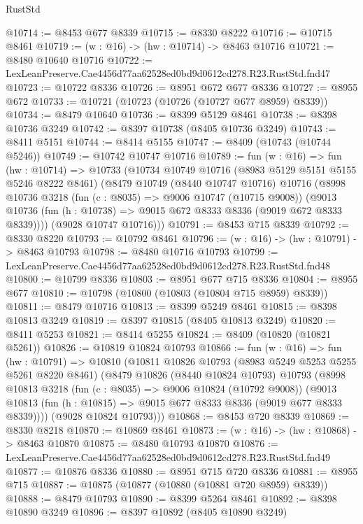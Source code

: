 \begin{lexlean}{RustStd}
\begin{coremodule}
@10714 := @8453 @677 @8339
@10715 := @8330 @8222
@10716 := @10715 @8461
@10719 := (w : @16) -> (hw : @10714) -> @8463 @10716
@10721 := @8480 @10640 @10716
@10722 := LexLeanPreserve.Cae4456d77aa62528ed0bd9d0612cd278.R23.RustStd.fnd47
@10723 := @10722 @8336
@10726 := @8951 @672 @677 @8336
@10727 := @8955 @672
@10733 := @10721 (@10723 (@10726 (@10727 @677 @8959) @8339))
@10734 := @8479 @10640
@10736 := @8399 @5129 @8461
@10738 := @8398 @10736 @3249
@10742 := @8397 @10738 (@8405 @10736 @3249)
@10743 := @8411 @5151
@10744 := @8414 @5155
@10747 := @8409 (@10743 (@10744 @5246))
@10749 := @10742 @10747 @10716
@10789 := fun (w : @16) =>
  fun (hw : @10714) =>
  @10733
    (@10734
      @10749
      @10716
      (@8983 @5129 @5151 @5155 @5246 @8222 @8461)
      (@8479
        @10749
        (@8440 @10747 @10716)
        @10716
        (@8998
          @10736
          @3218
          (fun (c : @8035) => @9006 @10747 (@10715 @9008))
          (@9013 @10736 (fun (h : @10738) => @9015 @672 @8333 @8336 (@9019 @672 @8333 @8339))))
        (@9028 @10747 @10716)))
@10791 := @8453 @715 @8339
@10792 := @8330 @8220
@10793 := @10792 @8461
@10796 := (w : @16) -> (hw : @10791) -> @8463 @10793
@10798 := @8480 @10716 @10793
@10799 := LexLeanPreserve.Cae4456d77aa62528ed0bd9d0612cd278.R23.RustStd.fnd48
@10800 := @10799 @8336
@10803 := @8951 @677 @715 @8336
@10804 := @8955 @677
@10810 := @10798 (@10800 (@10803 (@10804 @715 @8959) @8339))
@10811 := @8479 @10716
@10813 := @8399 @5249 @8461
@10815 := @8398 @10813 @3249
@10819 := @8397 @10815 (@8405 @10813 @3249)
@10820 := @8411 @5253
@10821 := @8414 @5255
@10824 := @8409 (@10820 (@10821 @5261))
@10826 := @10819 @10824 @10793
@10866 := fun (w : @16) =>
  fun (hw : @10791) =>
  @10810
    (@10811
      @10826
      @10793
      (@8983 @5249 @5253 @5255 @5261 @8220 @8461)
      (@8479
        @10826
        (@8440 @10824 @10793)
        @10793
        (@8998
          @10813
          @3218
          (fun (c : @8035) => @9006 @10824 (@10792 @9008))
          (@9013 @10813 (fun (h : @10815) => @9015 @677 @8333 @8336 (@9019 @677 @8333 @8339))))
        (@9028 @10824 @10793)))
@10868 := @8453 @720 @8339
@10869 := @8330 @8218
@10870 := @10869 @8461
@10873 := (w : @16) -> (hw : @10868) -> @8463 @10870
@10875 := @8480 @10793 @10870
@10876 := LexLeanPreserve.Cae4456d77aa62528ed0bd9d0612cd278.R23.RustStd.fnd49
@10877 := @10876 @8336
@10880 := @8951 @715 @720 @8336
@10881 := @8955 @715
@10887 := @10875 (@10877 (@10880 (@10881 @720 @8959) @8339))
@10888 := @8479 @10793
@10890 := @8399 @5264 @8461
@10892 := @8398 @10890 @3249
@10896 := @8397 @10892 (@8405 @10890 @3249)

\end{coremodule}
\end{lexlean}
